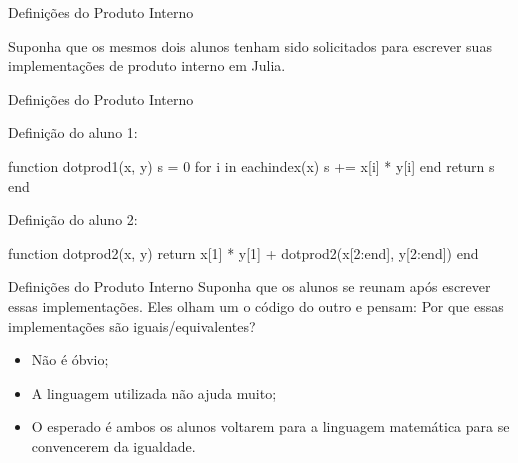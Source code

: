\begin{frame}{Definições do Produto Interno}
  \begin{center}
    Suponha que os mesmos dois alunos tenham sido solicitados para escrever suas implementações de produto interno em Julia.
  \end{center}
\end{frame}

\begin{frame}[fragile]{Definições do Produto Interno}
  \begin{minipage}[t]{0.45\textwidth}
    Definição do aluno 1:
    \vspace{0.5cm}
    \begin{code}
function dotprod1(x, y)
    s = 0
    for i in eachindex(x)
        s += x[i] * y[i]
    end
    return s
end
    \end{code}
  \end{minipage}
  \pause
  \hfill
  \vrule
  \hfill
  \begin{minipage}[t]{0.50\textwidth}
    Definição do aluno 2:
    \vspace{0.5cm}
    \begin{code}
function dotprod2(x, y)
    return x[1] * y[1] +
           dotprod2(x[2:end],
                    y[2:end])
end
    \end{code}
  \end{minipage}
  \vfill
\end{frame}

\begin{frame}{Definições do Produto Interno}
  Suponha que os alunos se reunam após escrever essas implementações. Eles olham um o código do outro e pensam: Por que essas implementações são iguais/equivalentes?

  \pause
  \vspace{0.5cm}

  \begin{itemize}
    \item Não é óbvio; \pause \\[0.2cm]
    \item A linguagem utilizada não ajuda muito; \pause \\[0.2cm]
    \item O esperado é ambos os alunos voltarem para a linguagem matemática para se convencerem da igualdade.
  \end{itemize}
\end{frame}

